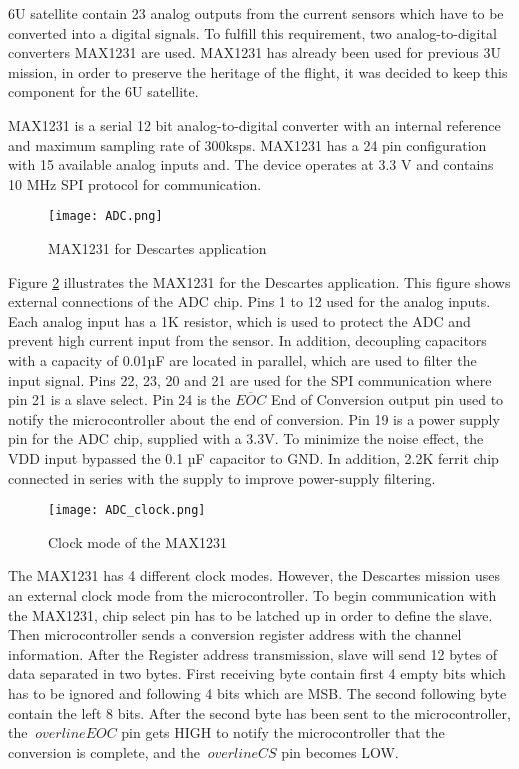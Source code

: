  6U satellite contain 23 analog outputs from the current sensors which have to be converted into a digital signals. To fulfill this requirement, two analog-to-digital converters MAX1231 are used. MAX1231 has already been used for previous 3U mission, in order to preserve the heritage of the flight, it was decided to keep this component for the 6U satellite.
 
  \cite{25}MAX1231 is a serial 12 bit  analog-to-digital converter with an internal reference and maximum sampling rate of 300ksps. MAX1231 has a 24 pin configuration with 15 available analog inputs and. The device operates at 3.3 V and contains 10 MHz SPI protocol for communication.
  
   \begin{figure}[h]
   	\centering
   	\texttt{[image: ADC.png]}
   	\caption{MAX1231 for Descartes application}
   	\label{fig: adc}
   \end{figure} 
 
  Figure \ref{fig: adc} illustrates the MAX1231 for the Descartes application. This figure shows external connections of the ADC chip. Pins 1 to 12 used for the analog inputs. Each analog input has a 1K resistor, which is used to protect the ADC and prevent high current input from the sensor. In addition, decoupling capacitors with a capacity of 0.01µF are located in parallel, which are used to filter the input signal. Pins 22, 23, 20 and 21 are used for the SPI communication where pin 21 is a slave select. Pin 24 is the $\overline{EOC}$ End of Conversion output pin used to notify the microcontroller about the end of conversion. Pin 19 is a power supply pin for the ADC chip, supplied with a 3.3V. To minimize the noise effect, the VDD input bypassed the 0.1 µF capacitor to GND. In addition, 2.2K ferrit chip connected in series with the supply to improve power-supply filtering. 
 
  \begin{figure}[h]
  	\centering
  	\texttt{[image: ADC\_clock.png]}
  	\caption{Clock mode of the MAX1231 \cite{25}}
  	\label{fig: adc}
  \end{figure} 
 
 The MAX1231 has 4 different clock modes. However, the Descartes mission uses an external clock mode from the microcontroller.  To begin communication with the MAX1231, chip select pin has to be latched up in order to define the slave. Then microcontroller sends a conversion register address with the channel information. After the Register address transmission, slave will send 12 bytes of data separated in two bytes. First receiving byte contain first 4 empty bits which has to be ignored and following 4 bits which are MSB. The second following byte contain the left 8 bits. After the second byte has been sent to the microcontroller, the $ \ overline {EOC} $ pin gets HIGH to notify the microcontroller that the conversion is complete, and the $ \ overline {CS} $ pin becomes LOW.
 
